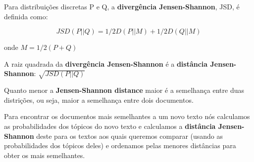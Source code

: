 Para distribuições discretas P e Q, a \textbf{divergência Jensen-Shannon}, JSD, é definida como:

\[JSD(P||Q) = 1/2D(P||M) + 1/2D(Q||M)\]

onde \(M = 1/2(P + Q)\)

A raiz quadrada da \textbf{divergência Jensen-Shannon} é a \textbf{distância Jensen-Shannon}: \(\sqrt{JSD(P||Q)}\)

Quanto menor a \textbf{Jensen-Shannon distance} maior é a semelhança entre duas distrições, ou seja, maior a semelhança entre dois documentos.

Para encontrar os documentos mais semelhantes a um novo texto nós calculamos as probabilidades dos tópicos do novo texto e calculamos a 
\textbf{distância Jensen-Shannon} deste para os textos aos quais queremos comparar (usando as probabilidades dos tópicos deles) e ordenamos pelas 
menores distâncias para obter os mais semelhantes.